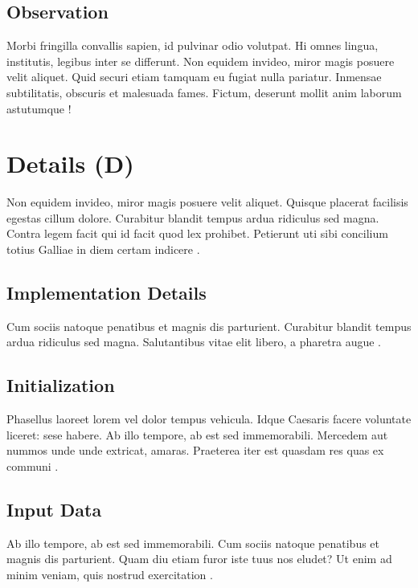 \section{Observation}

Morbi fringilla convallis sapien, id pulvinar odio volutpat. Hi omnes lingua, institutis, legibus inter se differunt. Non equidem invideo, miror magis posuere velit aliquet. Quid securi etiam tamquam eu fugiat nulla pariatur. Inmensae subtilitatis, obscuris et malesuada fames. Fictum, deserunt mollit anim laborum astutumque \autocite{wilensky2007}!


\chapter{Details (D)}

Non equidem invideo, miror magis posuere velit aliquet. Quisque placerat facilisis egestas cillum dolore. Curabitur blandit tempus ardua ridiculus sed magna. Contra legem facit qui id facit quod lex prohibet. Petierunt uti sibi concilium totius Galliae in diem certam indicere \autocite{schelling1971}.

\section{Implementation Details}

Cum sociis natoque penatibus et magnis dis parturient. Curabitur blandit tempus ardua ridiculus sed magna. Salutantibus vitae elit libero, a pharetra augue \autocite{epstein1996}.

\section{Initialization}

Phasellus laoreet lorem vel dolor tempus vehicula. Idque Caesaris facere voluntate liceret: sese habere. Ab illo tempore, ab est sed immemorabili. Mercedem aut nummos unde unde extricat, amaras. Praeterea iter est quasdam res quas ex communi \autocite{axelrod1997a}.

\section{Input Data}

Ab illo tempore, ab est sed immemorabili. Cum sociis natoque penatibus et magnis dis parturient. Quam diu etiam furor iste tuus nos eludet? Ut enim ad minim veniam, quis nostrud exercitation \autocite{epstein1999}.

